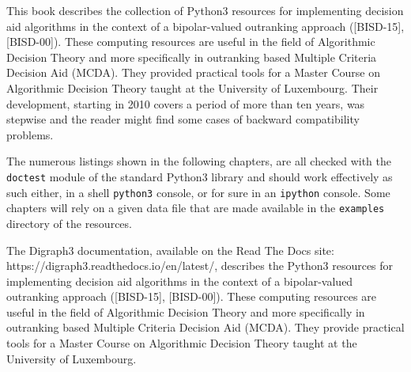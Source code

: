 %
%

\preface





This book describes the \Digraph collection of Python3 resources for implementing decision aid algorithms in the context of a bipolar-valued outranking approach ([BISD-15], [BISD-00]). These computing resources are useful in the field of Algorithmic Decision Theory and more specifically in outranking based Multiple Criteria Decision Aid (MCDA). They provided practical tools for a Master Course on Algorithmic Decision Theory taught at the University of Luxembourg. Their development, starting in 2010 covers a period of more than ten years, was stepwise and the reader might find some cases of backward compatibility problems.

The numerous listings shown in the following chapters, are all checked with the \texttt{doctest} module of the standard Python3 library and should work effectively as such either, in a shell \texttt{python3} console, or for sure in an \texttt{ipython} console. Some chapters will rely on a given data file that are made available in the \texttt{examples} directory of the \Digraph resources. 

The Digraph3 documentation, available on the Read The Docs site: https://digraph3.readthedocs.io/en/latest/, describes the Python3 resources for implementing decision aid algorithms in the context of a bipolar-valued outranking approach ([BISD-15], [BISD-00]). These computing resources are useful in the field of Algorithmic Decision Theory and more specifically in outranking based Multiple Criteria Decision Aid (MCDA). They provide practical tools for a Master Course on Algorithmic Decision Theory taught at the University of Luxembourg.

